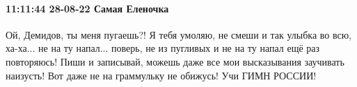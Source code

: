  
 
 
 
 

\paragraph{11:11:44 28-08-22 Самая Еленочка}

Ой, Демидов, ты меня пугаешь?! Я тебя умоляю, не смеши и так улыбка во всю,
ха-ха... не на ту напал... поверь, не из пугливых и не на ту напал ещё раз
повторяюсь! Пиши и записывай, можешь даже все мои высказывания заучивать
наизусть! Вот даже не на граммульку не обижусь! Учи ГИМН РОССИИ!
